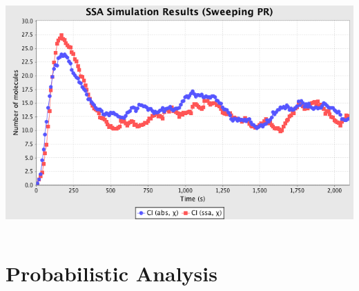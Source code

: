 \documentclass[titlepage,11pt]{article}
\begin{document}
\includegraphics[height=90mm]{screenshots/absResults}

\clearpage 

\section{Probabilistic Analysis}
\end{document}
